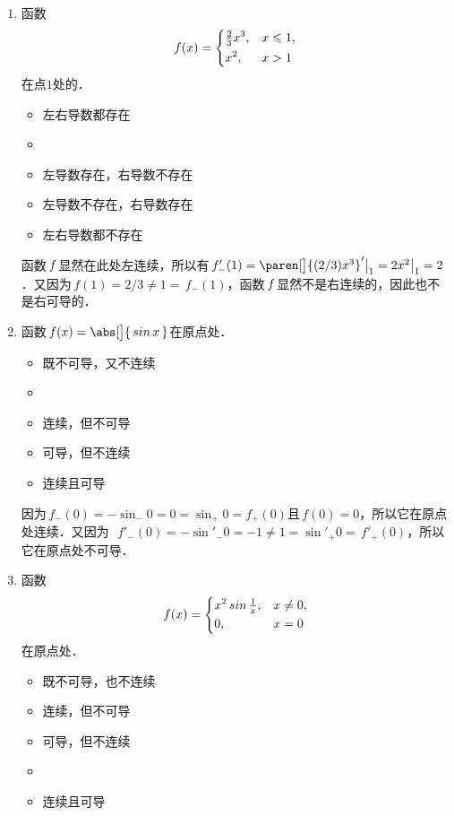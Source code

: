 \begin{enumerate}
\item 函数
  \begin{equation*}
    f(x) =
    \begin{dcases}
      \tfrac23 x^3, & x \le 1, \\
      x^2, & x > 1
    \end{dcases}
  \end{equation*}
  在点\(1\)处的\uline{\hspace{10em}}．
  \begin{itemize}
    \renewcommand{\labelitemi}{\faCircleThin}
  \item 左右导数都存在
    \ifshowsol
    \item[\faCircle]
    \else
    \item
    \fi
    左导数存在，右导数不存在
  \item 左导数不存在，右导数存在
  \item 左右导数都不存在
  \end{itemize}

  \ifshowsol
    函数\(\,f\mkern2mu\)显然在此处左连续，所以有\(\,f'_-(1) = \paren[\big]{(2/3) x^3}'\big\vert_1 = 2x^2\big\vert_1 = 2\)．又因为\(\,f(1) = 2/3 \ne 1 = \,f_-(1)\)，函数\(\,f\mkern2mu\)显然不是右连续的，因此也不是右可导的．
  \fi

\item 函数\(\,f(x) = \abs[\big]{\,\sin x\,}\)在原点处\uline{\hspace{8em}}．
  \begin{itemize}
    \renewcommand{\labelitemi}{\faCircleThin}
  \item 既不可导，又不连续
    \ifshowsol
    \item[\faCircle]
    \else
    \item
    \fi
    连续，但不可导
  \item 可导，但不连续
  \item 连续且可导
  \end{itemize}

  \ifshowsol
    因为\(\,f_-(0) = -\sin_-0 = 0 = \sin_+0 = f_+(0)\)且\(\,f(0) = 0\)，所以它在原点处连续．又因为~\(\,f'_-(0) = -\sin'_-0 = -1 \ne 1 = \sin'_+0 = \,f'_+(0)\)，所以它在原点处不可导．
  \fi

\item \label{B1.4.1.E4}函数
  \begin{equation*}
    f(x) =
    \begin{dcases}
      x^2 \sin\tfrac1x, & x \ne 0, \\
      0, & x = 0
    \end{dcases}
  \end{equation*}
  在原点处\uline{\hspace{8em}}．
  \begin{itemize}
    \renewcommand{\labelitemi}{\faCircleThin}
  \item 既不可导，也不连续
  \item 连续，但不可导
  \item 可导，但不连续
    \ifshowsol
    \item[\faCircle]
    \else
    \item
    \fi
    连续且可导
  \end{itemize}


\end{enumerate}
